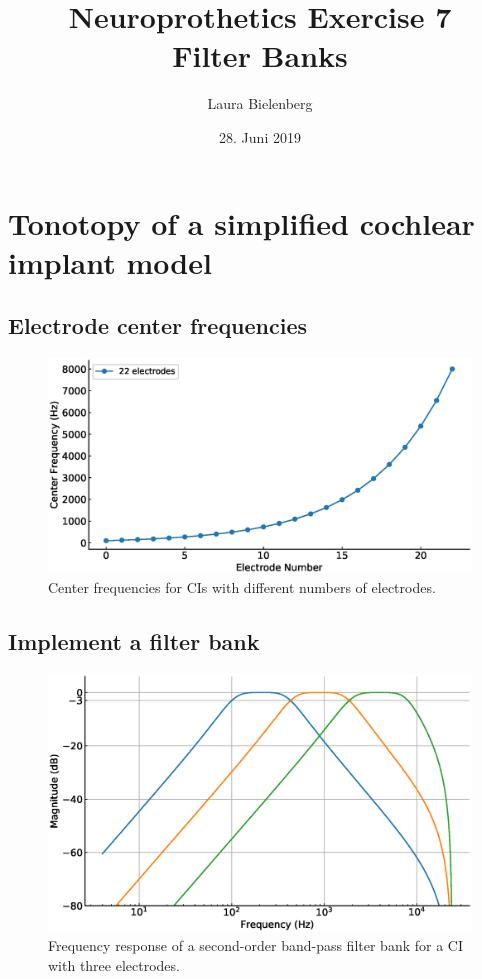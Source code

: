 \documentclass{scrartcl}			%
\title{Neuroprothetics Exercise 7\\Filter Banks}
\author{ Laura Bielenberg }
\date{28. Juni 2019}
\begin{document}

\maketitle

\section{Tonotopy of a simplified cochlear implant model}

\subsection{Electrode center frequencies}
\begin{figure}[H]
\includegraphics[width=\linewidth]{imgs/center_frequencies_22.eps}
    \caption{Center frequencies for CIs with different numbers of electrodes.} 
    \label{fig:center_freq} 
\end{figure}


\subsection{Implement a filter bank}

\begin{figure}[H]
\includegraphics[width=\linewidth]{imgs/ci_with_3_electrodes.eps}
    \caption{Frequency response of a second-order  band-pass filter bank for a CI with three electrodes.} 
    \label{fig:ci_3} 
\end{figure}
\end{document}

